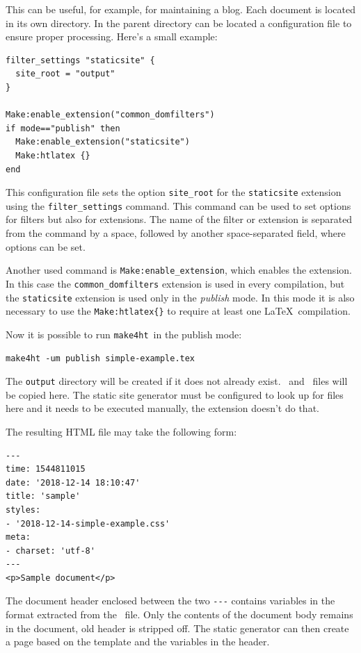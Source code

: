 \documentclass{ltugproc}
\newcommand\term[1]{\textit{#1}}
\newcommand\command[1]{\texttt{#1}}
\newcommand\makefourht{\command{make4ht}}
\newcommand\mkextension[1]{\texttt{#1}}
\begin{document}
This can be useful, for example, for maintaining a blog.
Each document is located in its own directory. In the parent directory
can be located a configuration file to ensure proper processing. Here's a small
example: 

\begin{verbatim}
filter_settings "staticsite" {
  site_root = "output" 
}

Make:enable_extension("common_domfilters")
if mode=="publish" then
  Make:enable_extension("staticsite")
  Make:htlatex {}
end

\end{verbatim}

This configuration file sets the option \verb|site_root| for the
\mkextension{staticsite} extension using the \texttt{fil\-ter\-\_\-set\-tings}
command.  This command can be used to set options for filters but also for
extensions.
The name of the filter or extension is separated from the command by a space,
followed by another space-separated field, where options can be set.

Another used command is \texttt{Make:\-enable\-\_\-ex\-ten\-sion}, which enables the
extension. In this case the \verb|common_domfilters| extension is used in every
compilation, but the \mkextension{staticsite} extension is used only in the  \term{publish}
mode. In this mode it is also necessary to use the \verb|Make:htlatex{}| to
require at least one \LaTeX\ compilation.

Now it is possible to run \makefourht\ in the publish mode:


\begin{verbatim}
make4ht -um publish simple-example.tex
\end{verbatim}

The \texttt{output} directory will be created if it does not already exist. \HTML\ and \CSS\ files will be copied here. The static site generator must be configured to look up for files here and it needs to be executed manually, the extension doesn't do that. 

The resulting HTML file may take the following form: 


\begin{verbatim}
---
time: 1544811015
date: '2018-12-14 18:10:47'
title: 'sample'
styles:
- '2018-12-14-simple-example.css'
meta:
- charset: 'utf-8'
---
<p>Sample document</p>
\end{verbatim}

The document header enclosed between the two \verb|---| contains variables in the 
format extracted from the \HTML\ file. Only the contents of the document body
remains in the document, old header is stripped off. The
static generator can then create a page based on the template and the variables
in the   header.
\end{document}
